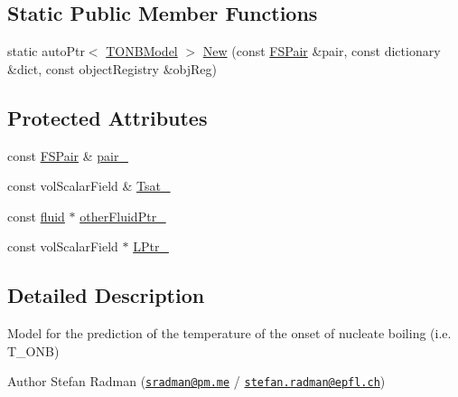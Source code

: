 \subsection*{Static Public Member Functions}
\begin{DoxyCompactItemize}
\item 
static auto\+Ptr$<$ \hyperlink{classFoam_1_1TONBModel}{T\+O\+N\+B\+Model} $>$ \hyperlink{classFoam_1_1TONBModel_adb431ddf087e79fec7a2b09c0c469715}{New} (const \hyperlink{classFoam_1_1FSPair}{F\+S\+Pair} \&pair, const dictionary \&dict, const object\+Registry \&obj\+Reg)
\end{DoxyCompactItemize}
\subsection*{Protected Attributes}
\begin{DoxyCompactItemize}
\item 
const \hyperlink{classFoam_1_1FSPair}{F\+S\+Pair} \& \hyperlink{classFoam_1_1TONBModel_a587e19a1b4f4b498d2604d20c093a73b}{pair\+\_\+}
\item 
const vol\+Scalar\+Field \& \hyperlink{classFoam_1_1TONBModel_a850ac645f80266cb218d8aa58aac9bc0}{Tsat\+\_\+}
\item 
const \hyperlink{classFoam_1_1fluid}{fluid} $\ast$ \hyperlink{classFoam_1_1TONBModel_a4615ddb7d592b36a28f7812ea1e824f7}{other\+Fluid\+Ptr\+\_\+}
\item 
const vol\+Scalar\+Field $\ast$ \hyperlink{classFoam_1_1TONBModel_a8865a7fcf53a1aaaf4091b83f658c47b}{L\+Ptr\+\_\+}
\end{DoxyCompactItemize}


\subsection{Detailed Description}
Model for the prediction of the temperature of the onset of nucleate boiling (i.\+e. T\+\_\+\+O\+NB) 

\label{_Description}%
 Author Stefan Radman (\href{mailto:sradman@pm.me}{\tt sradman@pm.\+me} / \href{mailto:stefan.radman@epfl.ch}{\tt stefan.\+radman@epfl.\+ch})

